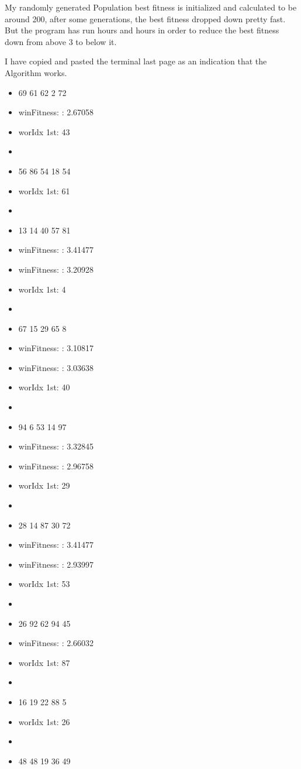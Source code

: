 \documentclass{article}
\begin{document}
\begin{CJK}{UTF8}{gbsn}
My randomly generated Population best fitness is initialized and calculated to be around 200, after some generations, the best fitness dropped down pretty fast. But the program has run hours and hours in order to reduce the best fitness down from above 3 to below it. 

I have copied and pasted the terminal last page as an indication that the Algorithm works. 
\begin{multicols}{2}
\begin{itemize}
\itemsep=-3pt
\item 69 61 62 2 72 
\item winFitness: : 2.67058
\item worIdx 1st: 43
\item 
\item 56 86 54 18 54 
\item worIdx 1st: 61
\item 
\item 13 14 40 57 81 
\item winFitness: : 3.41477
\item winFitness: : 3.20928
\item worIdx 1st: 4
\item 
\item 67 15 29 65 8 
\item winFitness: : 3.10817
\item winFitness: : 3.03638
\item worIdx 1st: 40
\item 
\item 94 6 53 14 97 
\item winFitness: : 3.32845
\item winFitness: : 2.96758
\item worIdx 1st: 29
\item 
\item 28 14 87 30 72 
\item winFitness: : 3.41477
\item winFitness: : 2.93997
\item worIdx 1st: 53
\item 
\item 26 92 62 94 45 
\item winFitness: : 2.66032
\item worIdx 1st: 87
\item 
\item 16 19 22 88 5 
\item worIdx 1st: 26
\item 
\item 48 48 19 36 49 

\end{itemize}
\end{multicols}
\end{CJK}
\end{document}
